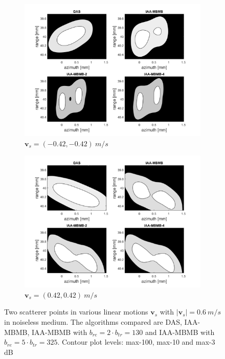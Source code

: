 \begin{figure}[ht]
\begin{subfigure}[t]{0.48\linewidth}
        \includegraphics[width=\linewidth]{./images/results/3/motion_45_-06.png}
        \caption{$\boldsymbol{v}_s = (-0.42, -0.42)~m/s$}
        \label{fig:double_diag2}
    \end{subfigure}
    \quad
    \begin{subfigure}[t]{0.48\linewidth}
        \includegraphics[width=\linewidth]{./images/results/3/motion_45_06.png}
        \caption{$\boldsymbol{v}_s = (0.42, 0.42)~m/s$}
    \end{subfigure}
	\caption{Two scatterer points in various linear motions $\boldsymbol{v}_s$ with $|\boldsymbol{v}_s|=0.6~m/s$ in noiseless medium. The algorithms compared are DAS, IAA-MBMB, IAA-MBMB with $b_{re} = 2 \cdot b_{tr} = 130$ and IAA-MBMB with $b_{re} = 5 \cdot b_{tr} = 325$. Contour plot levels: max-100, max-10 and max-3 dB}
	\label{fig:linear_motion_double_upsampled}
\end{figure}









